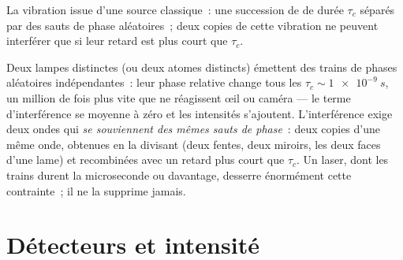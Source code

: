 \begin{omfigure}

{\small La vibration issue d'une source classique~: une succession de  de durée $\tau_c$ séparés par des sauts de phase aléatoires~; deux
copies de cette vibration ne peuvent interférer que si leur retard est plus court que $\tau_c$.}
\end{omfigure}

\begin{remark}\label{rem:b2:scalar-light-model:twosources}
Deux lampes distinctes (ou deux atomes distincts) émettent des trains de
phases aléatoires indépendantes~: leur phase relative change tous les $\tau_c
\sim \qty{1e-9}{s}$, un million de fois plus vite que ne réagissent œil ou caméra
--- le terme d'interférence se moyenne à zéro et les
intensités s'ajoutent. L'interférence exige deux ondes qui \emph{se souviennent des
mêmes sauts de phase}~: deux copies d'une même onde, obtenues en la divisant
(deux fentes, deux miroirs, les deux faces d'une lame) et recombinées avec un
retard plus court que $\tau_c$. Un laser, dont les trains durent la microseconde ou
davantage, desserre énormément cette contrainte~; il ne la supprime jamais.
\end{remark}

\section{Détecteurs et intensité}

